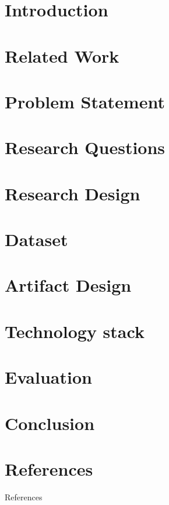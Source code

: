\documentclass{beamer}
\begin{document}

\section{Introduction}

%
%
\section{Related Work}

%
\section{Problem Statement}

%
\section{Research Questions}

%
\section{Research Design}

%
\section{Dataset}

%
\section{Artifact Design}

%
\section{Technology stack}

%
\section{Evaluation}

%
\section{Conclusion}

\section*{References}
{
\begin{frame}{References}
    \printbibliography
\end{frame}
}
\end{document}
